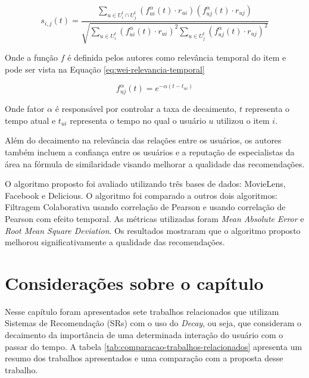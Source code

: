 \begin{equation}
  \label{eq:wei-similaridade}
  s_{i,j}(t) = \frac{\sum_{u \in U_i^t \cap U_j^t}{(f_{ui}^\alpha(t) \cdot r_{ui})(f_{uj}^\alpha(t) \cdot r_{uj})}}{\sqrt{\sum_{u \in U_i^t}{(f_{ui}^\alpha(t) \cdot r_{ui})}^2 \sum_{u \in U_j^t}{(f_{uj}^\alpha(t) \cdot r_{uj})}^2}}
\end{equation}

Onde a função $f$ é definida pelos autores como relevância temporal do item e pode ser vista na Equação \ref{eq:wei-relevancia-temporal}

\begin{equation}
  \label{eq:wei-relevancia-temporal}
  f_{uj}^\alpha(t) = e^{- \alpha (t - t_{ui})}
\end{equation}

Onde fator $\alpha$ é responsável por controlar a taxa de decaimento, $t$ representa o tempo atual e $t_{ui}$ representa
o tempo no qual o usuário $u$ utilizou o item $i$.

Além do decaimento na relevância das relações entre os usuários, os autores também incluem a confiança entre os
usuários e a reputação de especialistas da área na fórmula de similaridade visando melhorar a qualidade das
recomendações.

O algoritmo proposto foi avaliado utilizando três bases de dados: MovieLens, Facebook e Delicious. O algoritmo foi
comparado a outros dois algoritmos: Filtragem Colaborativa usando correlação de Pearson e usando correlação de Pearson
com efeito temporal. As métricas utilizadas foram \textit{Mean Absolute Error} e \textit{Root Mean Square Deviation}.
Os resultados mostraram que o algoritmo proposto melhorou significativamente a qualidade das recomendações.

\section{Considerações sobre o capítulo}

Nesse capítulo foram apresentados sete trabalhos relacionados que utilizam Sistemas de Recomendação (SRs) com o uso do
\textit{Decay}, ou seja, que consideram o decaimento da importância de uma determinada interação do usuário com o passar
do tempo. A tabela \ref{tab:comparacao-trabalhos-relacionados} apresenta um resumo dos trabalhos apresentados e uma comparação com
a proposta desse trabalho.

